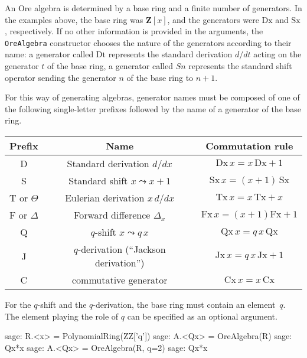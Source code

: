 \documentclass{amsart}
\def\Bold#1{\mathbf{#1}}
\begin{document}
An Ore algebra is determined by a base ring and a finite number of generators.
In the examples above, the base ring was $\Bold{Z}[x]$, and the generators were
$\mathrm{Dx}$ and $\mathrm{Sx}$, respectively. If no other information is provided
in the arguments, the \verb|OreAlgebra| constructor chooses the nature of the 
generators according to their name: a generator called $\mathrm{Dt}$ represents
the standard derivation $d/dt$ acting on the generator $t$ of the base ring, 
a generator called $Sn$ represents the standard shift operator sending the
generator $n$ of the base ring to $n+1$. 

For this way of generating algebras, generator names must be composed of
one of the following single-letter prefixes followed by the name of a generator
of the base ring. 

\begin{center}
  \begin{tabular}{|c|c|c|}\hline
    Prefix & Name & Commutation rule \\\hline
     D & Standard derivation $d/dx$ & $\mathrm{Dx}\,x=x\,\mathrm{Dx}+1$ \\
     S & Standard shift $x\leadsto x+1$ & $\mathrm{Sx}\,x=(x+1)\,\mathrm{Sx}$ \\
     T or $\Theta$ & Eulerian derivation $x\,d/dx$ & $\mathrm{Tx}\,x=x\,\mathrm{Tx}+x$ \\
     F or $\Delta$ & Forward difference $\Delta_x$ & $\mathrm{Fx}\,x=(x+1)\mathrm{Fx}+1$ \\
     Q & $q$-shift $x\leadsto q\,x$ & $\mathrm{Qx}\,x=q\,x\,\mathrm{Qx}$ \\
     J & $q$-derivation (``Jackson derivation'') & $\mathrm{Jx}\,x=q\,x\,\mathrm{Jx}+1$ \\ 
     C & commutative generator & $\mathrm{Cx}\,x = x\,\mathrm{Cx}$ \\\hline
  \end{tabular}
\end{center}

For the $q$-shift and the $q$-derivation, the base ring must contain an element~$q$.
The element playing the role of $q$ can be specified as an optional argument. 

\begin{sageexample}
  sage: R.<x> = PolynomialRing(ZZ['q'])
  sage: A.<Qx> = OreAlgebra(R)
  sage: Qx*x
  sage: A.<Qx> = OreAlgebra(R, q=2)
  sage: Qx*x
\end{sageexample}
\end{document}
